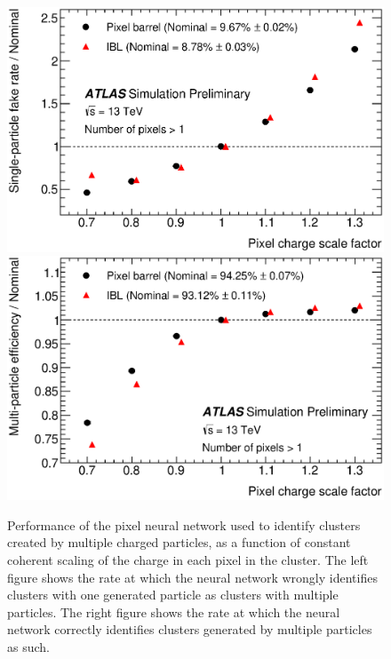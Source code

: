 \begin{centering}
\begin{figure}[bth]
\myfloatalign
\includegraphics[width=.45\linewidth]{figures/nn/fig_05a.eps}
\includegraphics[width=.45\linewidth]{figures/nn/fig_05b.eps}
\caption{Performance of the pixel neural network used to identify clusters created by multiple charged particles, as a function of constant coherent scaling of the charge in each pixel in the cluster. The left figure shows the rate at which the neural network wrongly identifies clusters with one generated particle as clusters with multiple particles. The right figure shows the rate at which the neural network correctly identifies clusters generated by multiple particles as such.}
\label{fig:13tev_charge_robustness}
\end{figure}
\end{centering}

